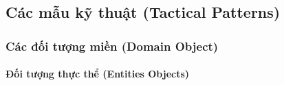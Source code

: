 \documentclass{article} %
\begin{document}







\subsection{Các mẫu kỹ thuật (Tactical Patterns)}

% 

\subsubsection{Các đối tượng miền (Domain Object)}

% 

\paragraph{Đối tượng thực thể (Entities Objects)}
\end{document}
